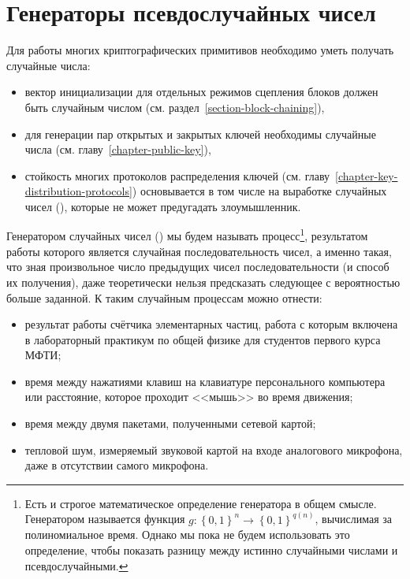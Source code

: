 \chapter{Генераторы псевдослучайных чисел}\label{chapter-generators}

Для работы многих криптографических примитивов необходимо уметь получать случайные числа:
\begin{itemize}
	\item вектор инициализации для отдельных режимов сцепления блоков должен быть случайным числом (см. раздел~\ref{section-block-chaining}),
	\item для генерации пар открытых и закрытых ключей необходимы случайные числа (см. главу~\ref{chapter-public-key}),
	\item стойкость многих протоколов распределения ключей (см. главу~\ref{chapter-key-distribution-protocols}) основывается в том числе на выработке случайных чисел (), которые не может предугадать злоумышленник.
\end{itemize}

Генератором случайных чисел () мы будем называть процесс\footnote{Есть и строгое математическое определение генератора в общем смысле. Генератором называется функция $g: \left\{0, 1\right\}^{n} \to \left\{0, 1\right\}^{q\left(n\right)}$, вычислимая за полиномиальное время. Однако мы пока не будем использовать это определение, чтобы показать разницу между истинно случайными числами и псевдослучайными.}, результатом работы которого является случайная последовательность чисел, а именно такая, что зная произвольное число предыдущих чисел последовательности (и способ их получения), даже теоретически нельзя предсказать следующее с вероятностью больше заданной. К таким случайным процессам можно отнести:

\begin{itemize}
	\item результат работы счётчика элементарных частиц, работа с которым включена в лабораторный практикум по общей физике для студентов первого курса МФТИ;
	\item время между нажатиями клавиш на клавиатуре персонального компьютера или расстояние, которое проходит <<мышь>> во время движения;
	\item время между двумя пакетами, полученными сетевой картой;
	\item тепловой шум, измеряемый звуковой картой на входе аналогового микрофона, даже в отсутствии самого микрофона.
\end{itemize}

